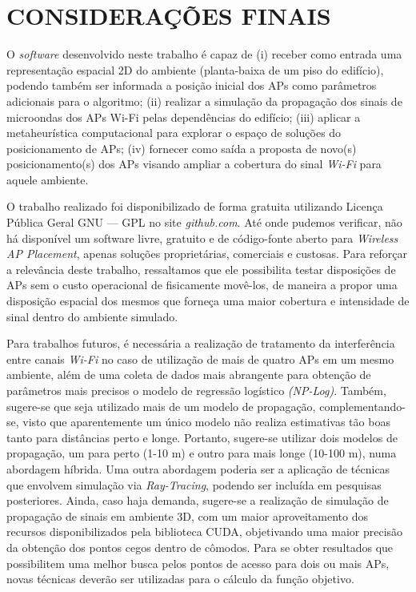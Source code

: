 \documentclass[
	12pt,				%
	openright,			%
	twoside,			%
	a4paper,			%
	english,			%
	french,				%
	spanish,			%
	brazil				%
	]{abntex2}
\begin{document}
\chapter[CONSIDERAÇÕES FINAIS]{CONSIDERAÇÕES FINAIS}

O \textit{software} desenvolvido neste trabalho é capaz de (i) receber como entrada uma representação espacial 2D do ambiente (planta-baixa de um piso do edifício), podendo também ser informada a posição inicial dos APs como parâmetros adicionais para o algoritmo; (ii) realizar a simulação da propagação dos sinais de microondas dos APs Wi-Fi pelas dependências do edifício; (iii) aplicar a metaheurística computacional para explorar o espaço de soluções do posicionamento de APs; (iv) fornecer como saída a proposta de novo(s) posicionamento(s) dos APs visando ampliar a cobertura do sinal \textit{Wi-Fi} para aquele ambiente.

O trabalho realizado foi disponibilizado de forma gratuita utilizando Licença Pública Geral GNU — GPL no site \textit{github.com}.  Até onde pudemos verificar, não há disponível um software livre, gratuito e de código-fonte aberto para \textit{Wireless AP Placement}, apenas soluções proprietárias, comerciais e custosas. Para reforçar a relevância deste trabalho, ressaltamos que ele possibilita testar disposições de APs sem o custo operacional de fisicamente movê-los, de maneira a propor uma disposição espacial dos mesmos que forneça uma maior cobertura e intensidade de sinal dentro do ambiente simulado.

Para trabalhos futuros, é necessária a realização de tratamento da interferência entre canais \textit{Wi-Fi} no caso de utilização de mais de quatro APs em um mesmo ambiente, além de uma coleta de dados mais abrangente para obtenção de parâmetros mais precisos o modelo de regressão logístico \textit{(NP-Log)}. Também, sugere-se que seja utilizado mais de um modelo de propagação, complementando-se, visto que aparentemente um único modelo não realiza estimativas tão boas tanto para distâncias perto e longe. Portanto, sugere-se utilizar dois modelos de propagação, um para perto (1-10 m) e outro para mais longe (10-100 m), numa abordagem híbrida. Uma outra abordagem poderia ser a aplicação de técnicas que envolvem simulação via \textit{Ray-Tracing}, podendo ser incluída em pesquisas posteriores. Ainda, caso haja demanda, sugere-se a realização de simulação de propagação de sinais em ambiente 3D, com um maior aproveitamento dos recursos disponibilizados pela biblioteca CUDA, objetivando uma maior precisão da obtenção dos pontos cegos dentro de cômodos. Para se obter resultados que possibilitem uma melhor busca pelos pontos de acesso para dois ou mais APs, novas técnicas deverão ser utilizadas para o cálculo da função objetivo. 
\end{document}
